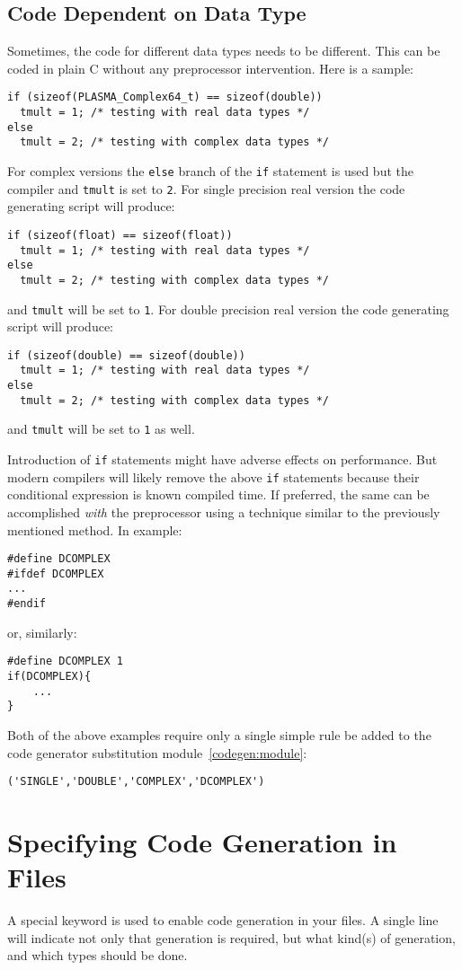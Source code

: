 \subsection{Code Dependent on Data Type}
Sometimes, the code for different data types needs to be different.
This can be coded in plain C without any preprocessor intervention.
Here is a sample:
\begin{verbatim}
if (sizeof(PLASMA_Complex64_t) == sizeof(double))
  tmult = 1; /* testing with real data types */
else
  tmult = 2; /* testing with complex data types */
\end{verbatim}
For complex versions the \texttt{else} branch of the \texttt{if}
statement is used but the compiler and \texttt{tmult} is set
to \texttt{2}. For single precision real version the code generating
script will produce:
\begin{verbatim}
if (sizeof(float) == sizeof(float))
  tmult = 1; /* testing with real data types */
else
  tmult = 2; /* testing with complex data types */
\end{verbatim}
and \texttt{tmult} will be set to \texttt{1}.
For double precision real version the code generating
script will produce:
\begin{verbatim}
if (sizeof(double) == sizeof(double))
  tmult = 1; /* testing with real data types */
else
  tmult = 2; /* testing with complex data types */
\end{verbatim}
and \texttt{tmult} will be set to \texttt{1} as well.

Introduction of \texttt{if} statements might have adverse effects
on performance. But modern compilers will likely remove the above
\texttt{if} statements because their conditional expression is known
compiled time.  If preferred, the same can be accomplished \textit{with} the
preprocessor using a technique similar to the previously mentioned method. 
In example:
\begin{verbatim}
#define DCOMPLEX
#ifdef DCOMPLEX
...
#endif
\end{verbatim}
or, similarly:
\begin{verbatim}
#define DCOMPLEX 1
if(DCOMPLEX){
	...
}
\end{verbatim}
Both of the above examples require only a single simple rule be added 
to the code generator substitution module~\ref{codegen:module}:
\begin{verbatim}
('SINGLE','DOUBLE','COMPLEX','DCOMPLEX')
\end{verbatim}

\section{Specifying Code Generation in Files}
\label{codegen:header}
A special keyword is used to enable code generation in your files.  A single line 
will indicate not only that generation is required, but what kind(s) of generation,
and which types should be done. 
